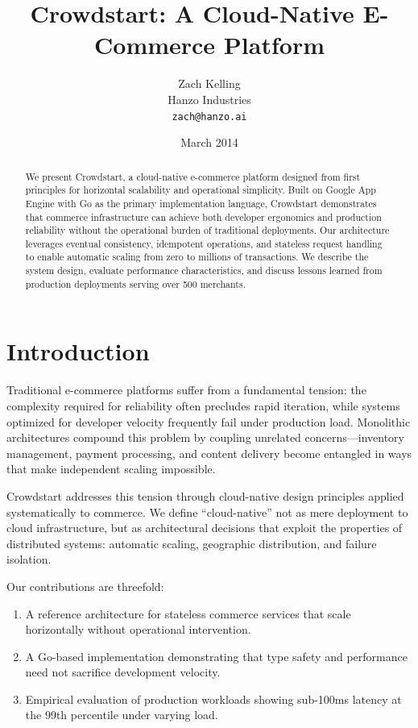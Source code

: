 \documentclass[11pt,twocolumn]{article}
\title{Crowdstart: A Cloud-Native E-Commerce Platform}
\author{Zach Kelling\\
Hanzo Industries\\
\texttt{zach@hanzo.ai}}
\date{March 2014}
\begin{document}
\maketitle
\luxcoverpage

\begin{abstract}
We present Crowdstart, a cloud-native e-commerce platform designed from first principles for horizontal scalability and operational simplicity. Built on Google App Engine with Go as the primary implementation language, Crowdstart demonstrates that commerce infrastructure can achieve both developer ergonomics and production reliability without the operational burden of traditional deployments. Our architecture leverages eventual consistency, idempotent operations, and stateless request handling to enable automatic scaling from zero to millions of transactions. We describe the system design, evaluate performance characteristics, and discuss lessons learned from production deployments serving over 500 merchants.
\end{abstract}

\section{Introduction}

Traditional e-commerce platforms suffer from a fundamental tension: the complexity required for reliability often precludes rapid iteration, while systems optimized for developer velocity frequently fail under production load. Monolithic architectures compound this problem by coupling unrelated concerns—inventory management, payment processing, and content delivery become entangled in ways that make independent scaling impossible.

Crowdstart addresses this tension through cloud-native design principles applied systematically to commerce. We define ``cloud-native'' not as mere deployment to cloud infrastructure, but as architectural decisions that exploit the properties of distributed systems: automatic scaling, geographic distribution, and failure isolation.

Our contributions are threefold:
\begin{enumerate}
\item A reference architecture for stateless commerce services that scale horizontally without operational intervention.
\item A Go-based implementation demonstrating that type safety and performance need not sacrifice development velocity.
\item Empirical evaluation of production workloads showing sub-100ms latency at the 99th percentile under varying load.
\end{enumerate}
\end{document}
